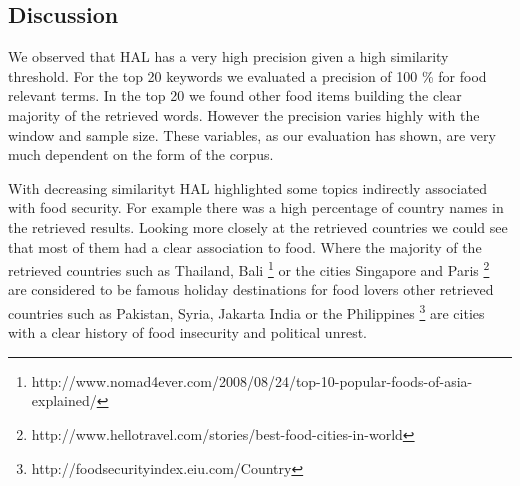  
\subsection{Discussion}

We observed that HAL has a very high precision given a high similarity threshold. For the top 20 keywords we evaluated a precision of 100 \% for food relevant terms. In the top 20 we found other food items building the clear majority of the retrieved words. However the precision varies highly with the window and sample size. These variables, as our evaluation has shown, are very much dependent on the form of the corpus.  

With decreasing similarityt HAL highlighted some topics indirectly associated with food security. For example there was  a high percentage of country names in the retrieved results. Looking more closely at the retrieved countries we could see that most of them had a clear association to food. Where the majority of the retrieved countries such as Thailand, Bali \footnote{http://www.nomad4ever.com/2008/08/24/top-10-popular-foods-of-asia-explained/} or the cities Singapore and Paris \footnote{http://www.hellotravel.com/stories/best-food-cities-in-world} are considered to be famous holiday destinations for food lovers other retrieved countries such as Pakistan, Syria, Jakarta India or the Philippines \footnote{http://foodsecurityindex.eiu.com/Country} are cities with a clear history of food insecurity and political unrest. 
 
